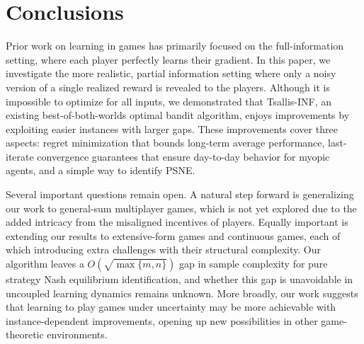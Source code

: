 \section{Conclusions}\label{sec:conclusions}
Prior work on learning in games has primarily focused on the full-information setting, where each player perfectly learns their gradient.
In this paper, we investigate the more realistic, partial information setting where only a noisy version of a single realized reward is revealed to the players.
Although it is impossible to optimize for all inputs,
we demonstrated that Tsallis-INF, an existing best-of-both-worlds optimal bandit algorithm, enjoys improvements by exploiting easier instances with larger gaps.
These improvements cover three aspects: regret minimization that bounds long-term average performance, last-iterate convergence guarantees that ensure day-to-day behavior for myopic agents, and a simple way to identify PSNE.

Several important questions remain open. A natural step forward is generalizing our work to general-sum multiplayer games, which is not yet explored due to the added intricacy from the misaligned incentives of players. Equally important is extending our results to extensive-form games and continuous games, each of which introducing extra challenges with their structural complexity. Our algorithm leaves a $O(\sqrt{\max\{m,n\}})$ gap in sample complexity for pure strategy Nash equilibrium identification, and whether this gap is unavoidable in uncoupled learning dynamics remains unknown. More broadly, our work suggests that learning to play games under uncertainty may be more achievable with instance-dependent improvements, opening up new possibilities in other game-theoretic environments.
